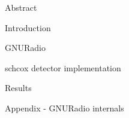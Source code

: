 




\usepackage{antropy_en}


  

  \begin{topchapter}{Abstract}
    
  \end{topchapter}

  \begin{topchapter}{Introduction}
    
  \end{topchapter}

  \begin{topchapter}{GNURadio}
    
  \end{topchapter}

  \begin{topchapter}{\acrlong{schcox} detector implementation}
    
  \end{topchapter}

  \begin{topchapter}{Results}
    
  \end{topchapter}

  \begin{topchapter}{Appendix - GNURadio internals}
    
  \end{topchapter}

  \newpage
  \printglossaries
  \printbibliography

